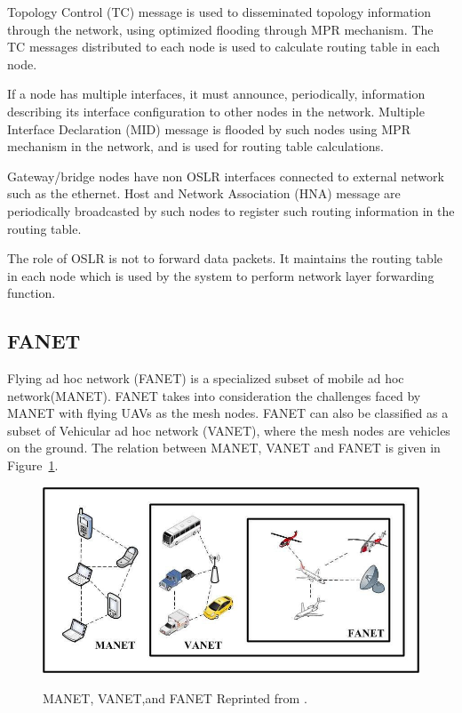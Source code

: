 Topology Control (TC) message is used to disseminated topology information through the network, using optimized flooding through MPR mechanism. The TC messages distributed to each node is used to calculate routing table in each node.

If a node has multiple interfaces, it must announce, periodically, information describing its interface configuration to other nodes in the network. Multiple Interface Declaration (MID) message is flooded by such nodes using MPR mechanism in the network, and is used for routing table calculations.

Gateway/bridge nodes have non OSLR interfaces connected to external network such as the ethernet. Host and Network Association (HNA) message are periodically broadcasted by such nodes to register such routing information in the routing table.


The role of OSLR is not to forward data packets. It maintains the routing table in each node which is used by the system to perform network layer forwarding function.

\subsection{FANET}

Flying ad hoc network (FANET) is a specialized subset of mobile ad hoc network(MANET). FANET takes into consideration the challenges faced by MANET with flying UAVs as the mesh nodes. FANET can also be classified as a subset of Vehicular ad hoc network (VANET), where the mesh nodes are vehicles on the ground. The relation between MANET, VANET and FANET is given in Figure~\ref{fig:manet-vanet-and-fanet}.

\begin{figure}
	\centering
	\caption[MANET, VANET and FANET]{\small 
		MANET, VANET,and FANET Reprinted from . }
	\includegraphics[width=5in]{figures/literature/MANET-VANET-and-FANET}
	\label{fig:manet-vanet-and-fanet}
\end{figure}

